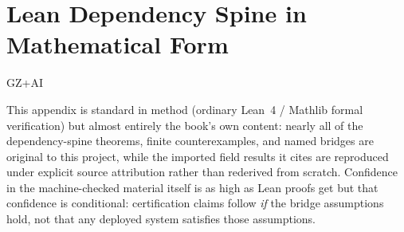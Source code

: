 \chapter{Lean Dependency Spine in Mathematical Form}
\label{appi-lean-proof-spine}

\begin{authbar}{GZ+AI}
\begin{epistemicstatus}
This appendix is standard in method (ordinary Lean~4 / Mathlib formal verification) but almost entirely the book's own content: 
nearly all of the dependency-spine theorems, finite counterexamples, and named bridges are original to this project, 
while the imported field results it cites are reproduced under explicit source attribution rather than rederived from scratch.
Confidence in the machine-checked material itself is as high as Lean proofs get but that confidence is conditional: 
certification claims follow \emph{if} the bridge assumptions hold, not that any deployed system satisfies those assumptions.
\end{epistemicstatus}
\end{authbar}

